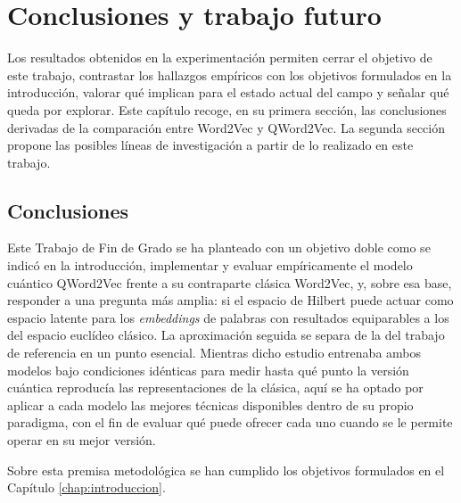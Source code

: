 \chapter{Conclusiones y trabajo futuro}
\label{chap:conclusiones}

Los resultados obtenidos en la experimentación permiten cerrar el objetivo de este trabajo, contrastar los hallazgos empíricos con los objetivos formulados en la introducción, valorar qué implican para el estado actual del campo y señalar qué queda por explorar. Este capítulo recoge, en su primera sección, las conclusiones derivadas de la comparación entre Word2Vec y QWord2Vec. La segunda sección propone las posibles líneas de investigación a partir de lo realizado en este trabajo.

\section{Conclusiones}

Este Trabajo de Fin de Grado se ha planteado con un objetivo doble como se indicó en la introducción, implementar y evaluar empíricamente el modelo cuántico QWord2Vec frente a su contraparte clásica Word2Vec, y, sobre esa base, responder a una pregunta más amplia: si el espacio de Hilbert puede actuar como espacio latente para los \textit{embeddings} de palabras con resultados equiparables a los del espacio euclídeo clásico. La aproximación seguida se separa de la del trabajo de referencia \cite{ohno_qword2vec_2025} en un punto esencial. Mientras dicho estudio entrenaba ambos modelos bajo condiciones idénticas para medir hasta qué punto la versión cuántica reproducía las representaciones de la clásica, aquí se ha optado por aplicar a cada modelo las mejores técnicas disponibles dentro de su propio paradigma, con el fin de evaluar qué puede ofrecer cada uno cuando se le permite operar en su mejor versión.

Sobre esta premisa metodológica se han cumplido los objetivos formulados en el Capítulo \ref{chap:introduccion}.

